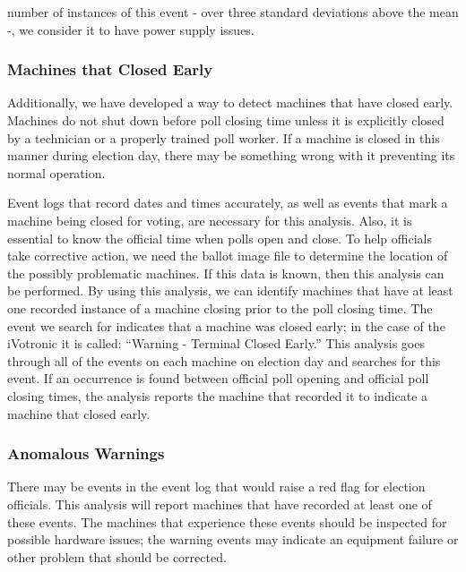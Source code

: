 number of instances of this event - over three standard deviations above the mean -, we consider it to have power supply issues.    

\subsubsection{Machines that Closed Early}
Additionally, we have developed a way to detect machines that have closed early. Machines do not shut down before poll closing time unless it is explicitly closed by a technician or a properly trained poll worker. If a machine is closed in this manner during election day, there may be something wrong with it preventing its normal operation.
                  
Event logs that record dates and times accurately, as well as events that mark a machine being closed for voting, are necessary for this analysis. Also, it is essential to know the official time when polls open and close. To help officials take corrective action, we need the ballot image file to determine the location of the possibly problematic machines.  If this data is known, then this analysis can be performed. By using this analysis, we can identify machines that have at least one recorded instance of a machine closing prior to the poll closing time. The event we search for indicates that a machine was closed early; in the case of the iVotronic it is called: \textquotedblleft Warning - Terminal Closed Early.\textquotedblright \hspace{2 mm} This analysis goes through all of the events on each machine on election day and searches for this event. If an occurrence is found between official poll opening and official poll closing times, the analysis reports the machine that recorded it to indicate a machine that closed early.  
        
\subsubsection{Anomalous Warnings}
There may be events in the event log that would raise a red flag for election officials. This analysis will report machines that have recorded at least one of these events. The machines that experience these events should be inspected for possible hardware issues; the warning events may indicate an equipment failure or other problem that should be corrected.

